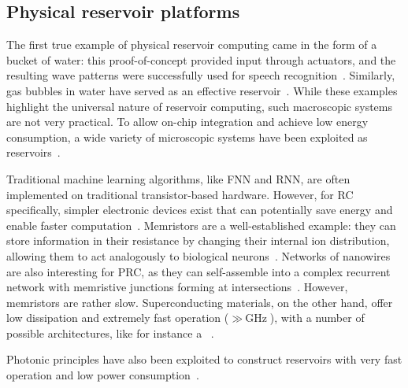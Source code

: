 \subsection{Physical reservoir platforms}\label{sec:1:PhysicalRCplatforms}
The first true example of physical reservoir computing came in the form of a bucket of water: this proof-of-concept provided input through actuators, and the resulting wave patterns were successfully used for speech recognition~\cite{PatternRecognition_Bucket}.
Similarly, gas bubbles in water have served as an effective reservoir~\cite{RC_GasBubbles}.
While these examples highlight the universal nature of reservoir computing, such macroscopic systems are not very practical.
To allow on-chip integration and achieve low energy consumption, a wide variety of microscopic systems have been exploited as reservoirs~\cite{RC_RecentAdvances}. \par
Traditional machine learning algorithms, like FNN and RNN, are often implemented on traditional transistor-based hardware.
However, for RC specifically, simpler electronic devices exist that can potentially save energy and enable faster computation~\cite{RC_RecentAdvances}.
Memristors are a well-established example: they can store information in their resistance by changing their internal ion distribution, allowing them to act analogously to biological neurons~\cite{MemristorArtificialNeuron,MemristiveNN,RC_DiffusiveMemristors,RC_MemristorTemporal}.
Networks of nanowires are also interesting for PRC, as they can self-assemble into a complex recurrent network with memristive junctions forming at intersections~\cite{RC_NNN}.
However, memristors are rather slow.
Superconducting materials, on the other hand, offer low dissipation and extremely fast operation ($\gg \SI{}{\giga\hertz}$), with a number of possible architectures, like for instance a ~\cite{RC_SuperconductingElectronics}. \par %
Photonic principles have also been exploited to construct reservoirs with very fast operation and low power consumption~\cite{RC_RecentAdvances}.
